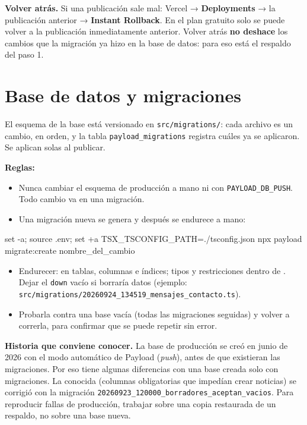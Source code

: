 \documentclass[11pt,letterpaper]{article}
\newcommand{\var}[1]{\nolinkurl{#1}}
\newcommand{\ruta}[1]{\nolinkurl{#1}}
\newcommand{\cmd}[1]{\texttt{\hyphenchar\font=-1\relax\detokenize{#1}}}
\begin{document}
\textbf{Volver atrás.} Si una publicación sale mal: Vercel → \textbf{Deployments} → la publicación anterior → \textbf{Instant Rollback}. En el plan gratuito solo se puede volver a la publicación inmediatamente anterior. Volver atrás \textbf{no deshace} los cambios que la migración ya hizo en la base de datos: para eso está el respaldo del paso 1.

\section{Base de datos y migraciones}

El esquema de la base está versionado en \ruta{src/migrations/}: cada archivo es un cambio, en orden, y la tabla \var{payload_migrations} registra cuáles ya se aplicaron. Se aplican solas al publicar.

\textbf{Reglas:}
\begin{itemize}
\item Nunca cambiar el esquema de producción a mano ni con \var{PAYLOAD_DB_PUSH}. Todo cambio va en una migración.
\item Una migración nueva se genera y después se endurece a mano:
\end{itemize}
\begin{codigo}
set -a; source .env; set +a
TSX_TSCONFIG_PATH=./tsconfig.json npx payload migrate:create nombre_del_cambio
\end{codigo}
\begin{itemize}
\item Endurecer: \cmd{IF NOT EXISTS} en tablas, columnas e índices; tipos y restricciones dentro de \texttt{}. Dejar el \var{down} vacío si borraría datos (ejemplo: \ruta{src/migrations/20260924_134519_mensajes_contacto.ts}).
\item Probarla contra una base vacía (todas las migraciones seguidas) y volver a correrla, para confirmar que se puede repetir sin error.
\end{itemize}

\textbf{Historia que conviene conocer.} La base de producción se creó en junio de 2026 con el modo automático de Payload (\emph{push}), antes de que existieran las migraciones. Por eso tiene algunas diferencias con una base creada solo con migraciones. La conocida (columnas obligatorias que impedían crear noticias) se corrigió con la migración \ruta{20260923_120000_borradores_aceptan_vacios}. Para reproducir fallas de producción, trabajar sobre una copia restaurada de un respaldo, no sobre una base nueva.
\end{document}
